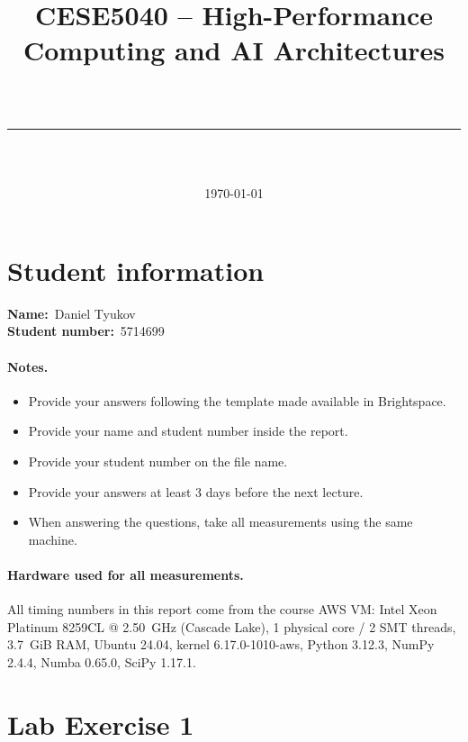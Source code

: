 \documentclass[11pt, a4paper]{article}
\title{%
    \vspace{-2em}
    \large CESE5040 -- High-Performance Computing and AI Architectures \\[0.4em]
    \Large \textbf{\labtitle} \\[0.6em]
    \rule{\linewidth}{0.4pt}
}
\author{\studentname{} \\ \texttt{\studentnumber}}
\date{\today}
\renewcommand{\studentname}{Daniel Tyukov}
\renewcommand{\studentnumber}{5714699}
\begin{document}
\maketitle
\thispagestyle{fancy}

\section{Student information}

\noindent\textbf{Name:}~\studentname{}\\
\textbf{Student number:}~\studentnumber{}

\paragraph{Notes.}
\begin{itemize}
    \itemsep0em
    \item Provide your answers following the template made available in Brightspace.
    \item Provide your name and student number inside the report.
    \item Provide your student number on the file name.
    \item Provide your answers at least 3 days before the next lecture.
    \item When answering the questions, take all measurements using the same machine.
\end{itemize}

\paragraph{Hardware used for all measurements.}
All timing numbers in this report come from the course AWS VM:
Intel Xeon Platinum 8259CL @ \SI{2.50}{GHz} (Cascade Lake), 1 physical core
/ 2 SMT threads, \SI{3.7}{GiB} RAM, Ubuntu 24.04, kernel 6.17.0-1010-aws,
Python 3.12.3, NumPy 2.4.4, Numba 0.65.0, SciPy 1.17.1.

\section{Lab Exercise 1}
\end{document}
